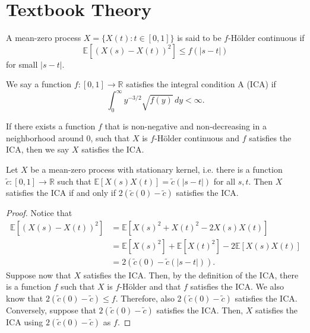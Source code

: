 \section{Textbook Theory}
\label{sec:textbook-theory}


\begin{definition}
    A mean-zero process $X = \{X(t) : t \in [0, 1]\}$ is said to be $f$-H\"older continuous if
    \[
        \mathbb{E}\left[(X(s) - X(t))^2 \right] \leq f(|s - t|)
    \]
    for small $|s-t|$.
\end{definition}


\begin{definition}
    We say a function $f: [0, 1] \to \mathbb{R}$ satisfies the integral condition A (ICA) if
    \[
        \int_0^\infty y^{-3/2} \sqrt{f(y)} \, dy < \infty.
    \]
\end{definition}

\begin{definition}
    If there exists a function $f$ that is non-negative and non-decreasing in a neighborhood around
    0, such that $X$ is $f$-H\"older continuous and $f$ satisfies the ICA, then we say $X$ satisfies
    the ICA.
\end{definition}


\begin{proposition}\label{prop:IcaSymmetricKernel}
    Let $X$ be a mean-zero process with stationary kernel, i.e. there is a function $\tilde{c} : [0,
    1] \to \mathbb{R}$ such that $\mathbb{E}[X(s) X(t)] = \tilde{c}(|s - t|)$ for all $s, t$. Then
    $X$ satisfies the ICA if and only if $2 (\tilde{c}(0) - \tilde{c})$ satisfies the ICA.
\end{proposition}
\begin{proof}
    Notice that
    \begin{align}
        \mathbb{E}\left[(X(s) - X(t))^2\right]
        &= \mathbb{E}\left[X(s)^2 + X(t)^2 - 2 X(s) X(t)\right] \\
        &= \mathbb{E}[X(s)^2] + \mathbb{E}[X(t)^2] - 2 \mathbb{E}[X(s) X(t)] \\
        &= 2 (\tilde{c}(0) - \tilde{c}(|s - t|)).
    \end{align}
    Suppose now that $X$ satisfies the ICA. Then, by the definition of the ICA, there is a function
    $f$ such that $X$ is $f$-H\"older and that $f$ satisfies the ICA. We also know that $2
    (\tilde{c}(0) - \tilde{c}) \leq f$. Therefore, also $2 (\tilde{c}(0) - \tilde{c})$ satisfies the
    ICA. Conversely, suppose that $2 (\tilde{c}(0) - \tilde{c})$ satisfies the ICA. Then, $X$
    satisfies the ICA using $2 (\tilde{c}(0) - \tilde{c})$ as $f$.
\end{proof}


